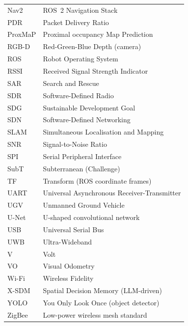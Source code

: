 \documentclass{thesis-report}
\begin{document}
\begin{longtable}{@{}ll@{}}
Nav2 & ROS~2 Navigation Stack \\
PDR & Packet Delivery Ratio \\
ProxMaP & Proximal occupancy Map Prediction \\
RGB-D & Red-Green-Blue Depth (camera) \\
ROS & Robot Operating System \\
RSSI & Received Signal Strength Indicator \\
SAR & Search and Rescue \\
SDR & Software-Defined Radio \\
SDG & Sustainable Development Goal \\
SDN & Software-Defined Networking \\
SLAM & Simultaneous Localisation and Mapping \\
SNR & Signal-to-Noise Ratio \\
SPI & Serial Peripheral Interface \\
SubT & Subterranean (Challenge) \\
TF & Transform (ROS coordinate frames) \\
UART & Universal Asynchronous Receiver-Transmitter \\
UGV & Unmanned Ground Vehicle \\
U-Net & U-shaped convolutional network \\
USB & Universal Serial Bus \\
UWB & Ultra-Wideband \\
V & Volt \\
VO & Visual Odometry \\
Wi-Fi & Wireless Fidelity \\
X-SDM & Spatial Decision Memory (LLM-driven) \\
YOLO & You Only Look Once (object detector) \\
ZigBee & Low-power wireless mesh standard \\
\end{longtable}
\normalsize
\newpage

{}
\end{document}

